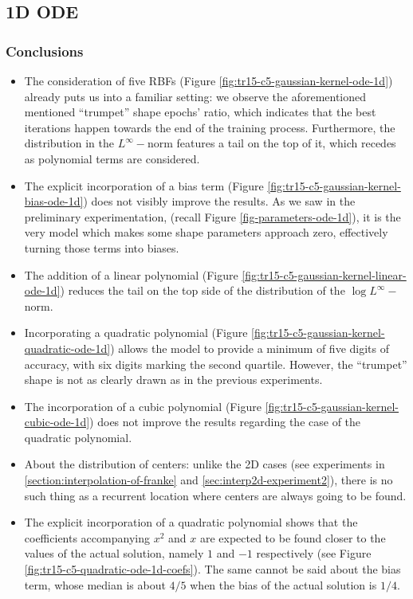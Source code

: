 \documentclass[12pt]{report} %
\begin{document}
\subsection*{1D ODE}


\subsubsection*{Conclusions}

\begin{itemize}
  \item The consideration of five RBFs (Figure \ref{fig:tr15-c5-gaussian-kernel-ode-1d})
        already puts us into a familiar setting:
        we observe the aforementioned mentioned ``trumpet'' shape epochs' ratio, which indicates that
        the best iterations happen towards the end of the training process.
        Furthermore, the distribution in the $L^\infty-$norm features a tail on the top of it, which
        recedes as polynomial terms are considered.
  \item The explicit incorporation of a bias term (Figure \ref{fig:tr15-c5-gaussian-kernel-bias-ode-1d})
        does not visibly improve the results. As we saw in the preliminary experimentation,
        (recall Figure \ref{fig-parameters-ode-1d}), it is the very model which makes some shape
        parameters approach zero, effectively turning those terms into biases.
  \item The addition of a linear polynomial (Figure \ref{fig:tr15-c5-gaussian-kernel-linear-ode-1d})
        reduces the tail on the top side of the distribution of the $\log L^\infty-$norm.
  \item Incorporating a quadratic polynomial (Figure \ref{fig:tr15-c5-gaussian-kernel-quadratic-ode-1d})
        allows the model to provide a minimum of five digits of accuracy, with six digits marking
        the second quartile. However, the ``trumpet'' shape is not as clearly drawn as in the previous
        experiments.
  \item The incorporation of a cubic polynomial (Figure \ref{fig:tr15-c5-gaussian-kernel-cubic-ode-1d})
        does not improve the results regarding the case of the quadratic polynomial.
  \item About the distribution of centers: unlike the 2D cases (see experiments in
        \ref{section:interpolation-of-franke} and \ref{sec:interp2d-experiment2}),
        there is no such thing as a recurrent
        location where centers are always going to be found.
  \item The explicit incorporation of a quadratic polynomial shows that the coefficients accompanying $x^2$ and $x$ are expected to be found closer to the values of the actual solution, namely $1$ and $-1$ respectively (see Figure \ref{fig:tr15-c5-quadratic-ode-1d-coefs}). The same cannot be said about the bias term, whose median is about $4/5$ when the bias of the actual solution is $1/4$.
\end{itemize}
\end{document}
